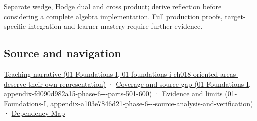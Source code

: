 Separate wedge, Hodge dual and cross product; derive reflection before considering a complete algebra implementation. Full production proofs, target-specific integration and learner mastery require further evidence.

\subsection{Source and navigation}\label{appendix-e1960925d1b8-source-and-navigation}

\href{../01-Foundations-I/main.pdf\#nameddest=01-foundations-i-ch018-oriented-areas-deserve-their-own-representation}{Teaching narrative (01-Foundations-I, 01-foundations-i-ch018-oriented-areas-deserve-their-own-representation)} · \href{../01-Foundations-I/main.pdf\#nameddest=appendix-fd090d982a15-phase-6---parts-501-600}{Coverage and source gap (01-Foundations-I, appendix-fd090d982a15-phase-6-\/-\/-parts-501-600)} · \href{../01-Foundations-I/main.pdf\#nameddest=appendix-a103e7846d21-phase-6---source-analysis-and-verification}{Evidence and limits (01-Foundations-I, appendix-a103e7846d21-phase-6-\/-\/-source-analysis-and-verification)} · \hyperref[appendix-4ad47bdd269a]{Dependency Map}
